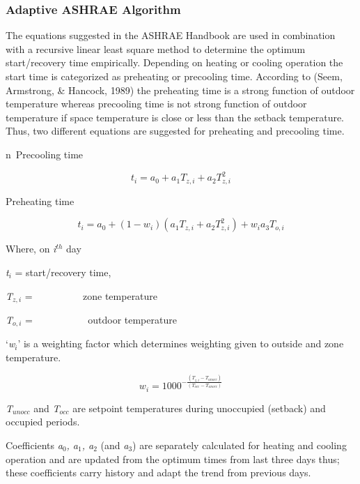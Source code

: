 \subsubsection{Adaptive ASHRAE Algorithm}\label{adaptive-ashrae-algorithm}

The equations suggested in the ASHRAE Handbook are used in combination with a recursive linear least square method to determine the optimum start/recovery time empirically. Depending on heating or cooling operation the start time is categorized as preheating or precooling time. According to (Seem, Armstrong, \& Hancock, 1989) the preheating time is a strong function of outdoor temperature whereas precooling time is not strong function of outdoor temperature if space temperature is close or less than the setback temperature. Thus, two different equations are suggested for preheating and precooling time.

n~Precooling time

\begin{equation}
{t_i} = {a_0} + {a_1}{T_{z,i}} + {a_2}T_{z,i}^2
\end{equation}

Preheating time

\begin{equation}
{t_i} = {a_0} + \left( {1 - {w_i}} \right)({a_1}{T_{z,i}} + {a_2}T_{z,i}^2) + {w_i}{a_3}{T_{o,i}}
\end{equation}

Where, on \emph{i}\(^{th}\) day

\emph{t\(_{i}\)} = start/recovery time,

\emph{T\(_{z,i}\)} = ~~~~~~~~~ zone temperature

\emph{T\(_{o,i}\)} = ~~~~~~~~~~ outdoor temperature

`\emph{w\(_{i}\)}' is a weighting factor which determines weighting given to outside and zone temperature.

\begin{equation}
{w_i} = {1000^{ - \frac{{\left( {{T_{z,i}} - {T_{unocc}}} \right)}}{{\left( {{T_{occ}} - {T_{unocc}}} \right)}}}}
\end{equation}

\emph{T\(_{unocc}\)} and \emph{T\(_{occ}\)} are setpoint temperatures during unoccupied (setback) and occupied periods.

Coefficients \emph{a\(_{0}\), a\(_{1}\), a\(_{2}\)} (and \emph{a\(_{3}\)}) are separately calculated for heating and cooling operation and are updated from the optimum times from last three days thus; these coefficients carry history and adapt the trend from previous days.

